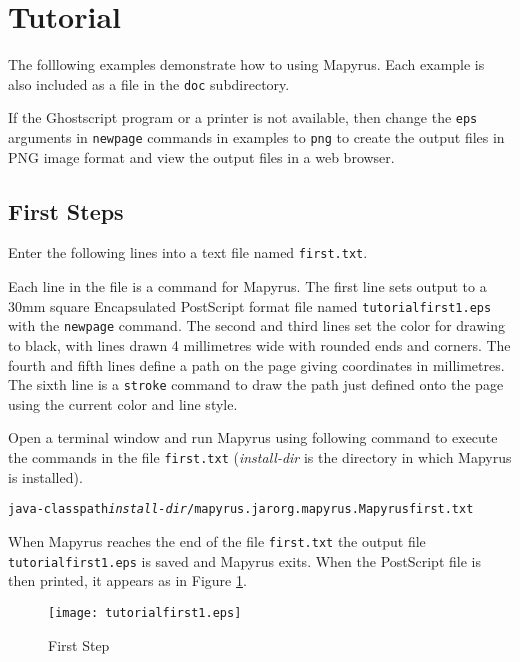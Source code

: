 
\section{Tutorial}

The folllowing examples demonstrate how to using Mapyrus.  Each example is also
included as a file in the \texttt{doc} subdirectory.

If the Ghostscript program or a printer is not available, then change the
\texttt{eps} arguments in \texttt{newpage} commands in examples to \texttt{png}
to create the output files in PNG image format and view the output files in a
web browser.

\subsection{First Steps}

Enter the following lines into a text file named \texttt{first.txt}.



Each line in the file is a command for Mapyrus.  The first line sets output to
a 30mm square Encapsulated PostScript format file named
\texttt{tutorialfirst1.eps} with the \texttt{newpage} command.  The second and
third lines set the color for drawing to black, with lines drawn 4 millimetres
wide with rounded ends and corners.  The fourth and fifth lines define a path
on the page giving coordinates in millimetres.  The sixth line is a
\texttt{stroke} command to draw the path just defined onto the page using the
current color and line style.

Open a terminal window and run Mapyrus using following command to execute the
commands in the file \texttt{first.txt} (\textit{install-dir} is the directory
in which Mapyrus is installed).

\begin{alltt}
java -classpath \textit{install-dir}/mapyrus.jar org.mapyrus.Mapyrus first.txt
\end{alltt}

When Mapyrus reaches the end of the file \texttt{first.txt}
the output file \texttt{tutorialfirst1.eps} is saved and Mapyrus exits.
When the PostScript file is then printed, it appears as in
Figure \ref{tutorialfirst1}.

\begin{figure}[htb]
\texttt{[image: tutorialfirst1.eps]}
\caption{First Step}
\label{tutorialfirst1}
\end{figure}


